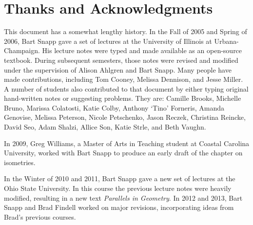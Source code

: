 \section*{Thanks and Acknowledgments}

This document has a somewhat lengthy history. In the Fall of 2005 and
Spring of 2006, Bart Snapp gave a set of lectures at the University of
Illinois at Urbana-Champaign. His lecture notes were typed and made
available as an open-source textbook. During subsequent semesters, those notes
were revised and modified under the supervision of Alison Ahlgren and
Bart Snapp. Many people have made contributions,
including Tom Cooney, Melissa Dennison, and Jesse Miller. A number of
students also contributed to that document by either typing original
hand-written notes or suggesting problems. They are: Camille Brooks,
Michelle Bruno, Marissa Colatosti, Katie Colby, Anthony `Tino'
Forneris, Amanda Genovise, Melissa Peterson, Nicole Petschenko, Jason
Reczek, Christina Reincke, David Seo, Adam Shalzi, Allice Son, Katie
Strle, and Beth Vaughn.

In 2009, Greg Williams, a Master of Arts in Teaching student at
Coastal Carolina University, worked with Bart Snapp to produce an
early draft of the chapter on isometries.

In the Winter of 2010 and 2011, Bart Snapp gave a new set of lectures
at the Ohio State University. In this course the previous lecture
notes were heavily modified, resulting in a new text \textit{Parallels
in Geometry}.  In 2012 and 2013,
Bart Snapp and Brad Findell worked on major revisions, incorporating
 ideas from Brad's previous courses. 

\makeatletter %
\renewcommand{\l@section}{\@dottedtocline{1}{5em}{5em}}
\renewcommand{\l@subsection}{\@dottedtocline{2}{5em}{5em}}
\renewcommand{\l@subsubsection}{\@dottedtocline{3}{5em}{5em}}
\makeatother

\setcounter{tocdepth}{1}
\tableofcontents
